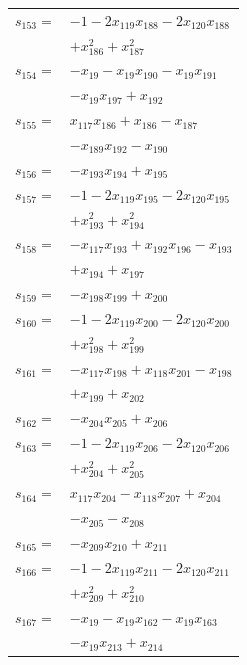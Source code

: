 \begin{longtable}{@{}r@{\;}l@{}}
\(s_{153}=\) & \(\displaystyle -1 -2x_{119}x_{188} -2x_{120}x_{188}\) \\
 & \(\displaystyle +x_{186}^{2} +x_{187}^{2}\) \\[3pt]
\(s_{154}=\) & \(\displaystyle -x_{19} -x_{19}x_{190} -x_{19}x_{191}\) \\
 & \(\displaystyle -x_{19}x_{197} +x_{192}\) \\[3pt]
\(s_{155}=\) & \(\displaystyle x_{117}x_{186} +x_{186} -x_{187}\) \\
 & \(\displaystyle -x_{189}x_{192} -x_{190}\) \\[3pt]
\(s_{156}=\) & \(\displaystyle -x_{193}x_{194} +x_{195}\) \\[3pt]
\(s_{157}=\) & \(\displaystyle -1 -2x_{119}x_{195} -2x_{120}x_{195}\) \\
 & \(\displaystyle +x_{193}^{2} +x_{194}^{2}\) \\[3pt]
\(s_{158}=\) & \(\displaystyle -x_{117}x_{193} +x_{192}x_{196} -x_{193}\) \\
 & \(\displaystyle +x_{194} +x_{197}\) \\[3pt]
\(s_{159}=\) & \(\displaystyle -x_{198}x_{199} +x_{200}\) \\[3pt]
\(s_{160}=\) & \(\displaystyle -1 -2x_{119}x_{200} -2x_{120}x_{200}\) \\
 & \(\displaystyle +x_{198}^{2} +x_{199}^{2}\) \\[3pt]
\(s_{161}=\) & \(\displaystyle -x_{117}x_{198} +x_{118}x_{201} -x_{198}\) \\
 & \(\displaystyle +x_{199} +x_{202}\) \\[3pt]
\(s_{162}=\) & \(\displaystyle -x_{204}x_{205} +x_{206}\) \\[3pt]
\(s_{163}=\) & \(\displaystyle -1 -2x_{119}x_{206} -2x_{120}x_{206}\) \\
 & \(\displaystyle +x_{204}^{2} +x_{205}^{2}\) \\[3pt]
\(s_{164}=\) & \(\displaystyle x_{117}x_{204} -x_{118}x_{207} +x_{204}\) \\
 & \(\displaystyle -x_{205} -x_{208}\) \\[3pt]
\(s_{165}=\) & \(\displaystyle -x_{209}x_{210} +x_{211}\) \\[3pt]
\(s_{166}=\) & \(\displaystyle -1 -2x_{119}x_{211} -2x_{120}x_{211}\) \\
 & \(\displaystyle +x_{209}^{2} +x_{210}^{2}\) \\[3pt]
\(s_{167}=\) & \(\displaystyle -x_{19} -x_{19}x_{162} -x_{19}x_{163}\) \\
 & \(\displaystyle -x_{19}x_{213} +x_{214}\) \\[3pt]

\end{longtable}
